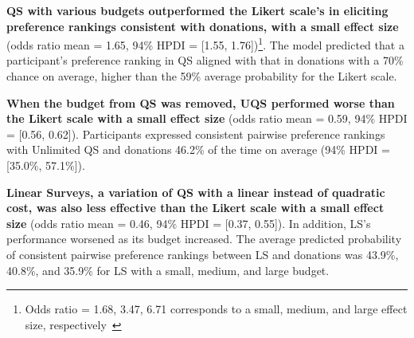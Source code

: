 \textbf{QS with various budgets outperformed the Likert scale's in eliciting preference rankings consistent with donations, with a small effect size} (odds ratio mean = 1.65, 94\% HPDI = [1.55, 1.76])\footnote{Odds ratio = 1.68, 3.47, 6.71 corresponds to a small, medium, and large effect size, respectively~\cite{chen2010big}}. The model predicted that a participant's preference ranking in QS aligned with that in donations with a 70\% chance on average, higher than the 59\% average probability for the Likert scale. 

\textbf{When the budget from QS was removed, UQS performed worse than the Likert scale with a small effect size} (odds ratio mean = 0.59, 94\% HPDI = [0.56, 0.62]). Participants expressed consistent pairwise preference rankings with Unlimited QS and donations 46.2\% of the time on average (94\% HPDI = [35.0\%, 57.1\%]). 

\textbf{Linear Surveys, a variation of QS with a linear instead of quadratic cost, was also less effective than the Likert scale with a small effect size} (odds ratio mean = 0.46, 94\% HPDI = [0.37, 0.55]). In addition, LS's performance worsened as its budget increased. The average predicted probability of consistent pairwise preference rankings between LS and donations was 43.9\%, 40.8\%, and 35.9\% for LS with a small, medium, and large budget.  